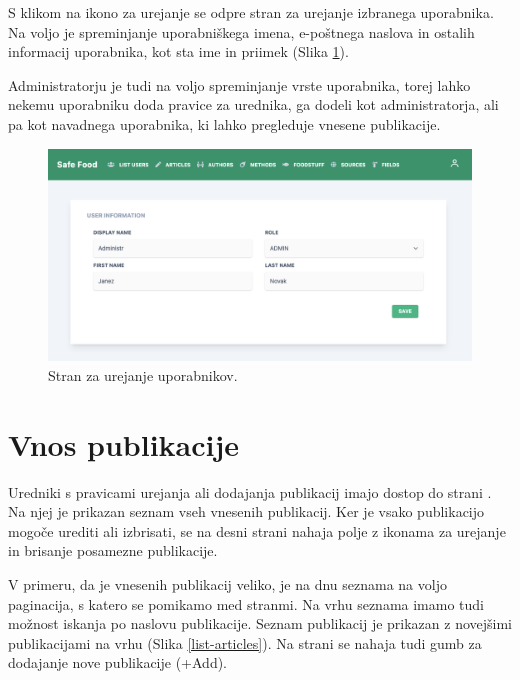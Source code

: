 S klikom na ikono za urejanje se odpre stran za urejanje izbranega uporabnika. Na voljo je spreminjanje uporabniškega imena, e-poštnega naslova in ostalih informacij uporabnika, kot sta ime in priimek (Slika \ref{users-edit-page}).

Administratorju je tudi na voljo spreminjanje vrste uporabnika, torej lahko nekemu uporabniku doda pravice za urednika, ga dodeli kot administratorja, ali pa kot navadnega uporabnika, ki lahko pregleduje vnesene publikacije.

\begin{figure}[h]
\begin{center}
\includegraphics[width=1\textwidth]{slike/users-edit.png}
\end{center}
\caption{ Stran za urejanje uporabnikov. }
\label{users-edit-page}
\end{figure}


\section{Vnos publikacije}
Uredniki s pravicami urejanja ali dodajanja publikacij imajo dostop do strani . Na njej je prikazan seznam vseh vnesenih publikacij. Ker je vsako publikacijo mogoče urediti ali izbrisati, se na desni strani nahaja polje z ikonama za urejanje in brisanje posamezne publikacije.

V primeru, da je vnesenih publikacij veliko, je na dnu seznama na voljo paginacija, s katero se pomikamo med stranmi. Na vrhu seznama imamo tudi možnost iskanja po naslovu publikacije. Seznam publikacij je prikazan z novejšimi publikacijami na vrhu (Slika \ref{list-articles}). Na strani se nahaja tudi gumb za dodajanje nove publikacije (+Add).

